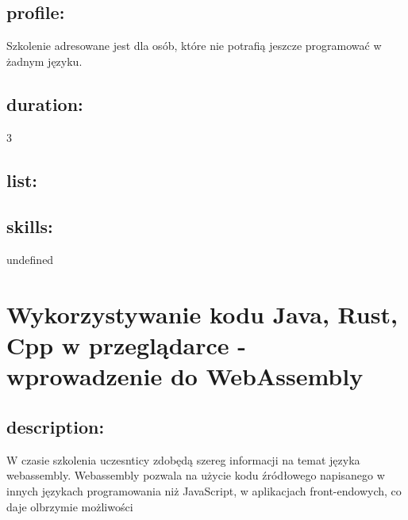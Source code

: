 \documentclass{article}[10pt]
\begin{document}
	\subsection*{profile:}
\begin{adjustwidth}{2cm}{}
	Szkolenie adresowane jest dla osób, które nie potrafią jeszcze programować w żadnym języku.
\end{adjustwidth}
	\subsection*{duration:}
\begin{adjustwidth}{2cm}{}
	3
\end{adjustwidth}

	\subsection*{list:}
\begin{adjustwidth}{1.5cm}{}
	\begin{itemize}










	\end{itemize}
\end{adjustwidth}

	\subsection*{skills:}
\begin{adjustwidth}{2cm}{}
	undefined
\end{adjustwidth}

\newpage


    
	\section{Wykorzystywanie kodu Java, Rust, Cpp w przeglądarce - wprowadzenie do WebAssembly}

	\subsection*{description:}
	\begin{adjustwidth}{2cm}{}
		W czasie szkolenia uczesnticy zdobędą szereg informacji na temat języka webassembly. Webassembly pozwala na użycie kodu źródłowego napisanego w innych językach programowania niż JavaScript, w aplikacjach front-endowych, co daje olbrzymie możliwości
	\end{adjustwidth}
\end{document}
